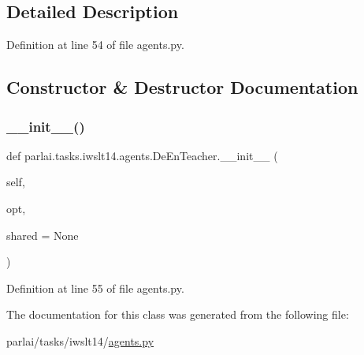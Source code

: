 \subsection{Detailed Description}


Definition at line 54 of file agents.\+py.



\subsection{Constructor \& Destructor Documentation}
\mbox{\label{classparlai_1_1tasks_1_1iwslt14_1_1agents_1_1DeEnTeacher_a1b0090df254e8af7cc6b0073362a400d}} 
\subsubsection{\texorpdfstring{\+\_\+\+\_\+init\+\_\+\+\_\+()}{\_\_init\_\_()}}
{\footnotesize\ttfamily def parlai.\+tasks.\+iwslt14.\+agents.\+De\+En\+Teacher.\+\_\+\+\_\+init\+\_\+\+\_\+ (\begin{DoxyParamCaption}\item[{}]{self,  }\item[{}]{opt,  }\item[{}]{shared = {\ttfamily None} }\end{DoxyParamCaption})}



Definition at line 55 of file agents.\+py.



The documentation for this class was generated from the following file\+:\begin{DoxyCompactItemize}
\item 
parlai/tasks/iwslt14/\hyperlink{parlai_2tasks_2iwslt14_2agents_8py}{agents.\+py}\end{DoxyCompactItemize}
